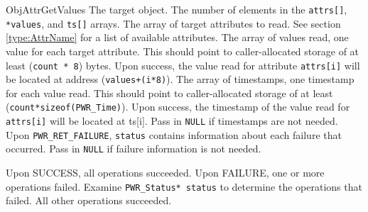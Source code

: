 \begin{prototype}{ObjAttrGetValues}
			{\pInput}{The target object.}
				{\pInput}{The number of elements in the \texttt{attrs[]}, \texttt{*values}, and \texttt{ts[]} arrays.}
		{\pInput}{The array of target attributes to read. See section \ref{type:AttrName} for a list of available attributes.}
			{\pOutput}	{The array of values read, one value for each target attribute. This should point to caller-allocated storage of at least (\texttt{count * 8}) bytes. Upon success, the value read for attribute \texttt{attrs[i]} will be located at address (\texttt{values+(i*8)}).}
			{\pOutput}{The array of timestamps, one timestamp for each value read. This should point to caller-allocated storage of at least (\texttt{count*sizeof(PWR_Time)}). Upon success, the timestamp of the value read for \texttt{attrs[i]} will be located at ts[i]. Pass in \texttt{NULL} if timestamps are not needed.}
			{\pOutput}{Upon \texttt{PWR_RET_FAILURE}, \texttt{status} contains information about each failure that occurred. Pass in \texttt{NULL} if failure information is not needed.}

	 		{Upon SUCCESS, all operations succeeded.}
	 		{Upon FAILURE, one or more operations failed. Examine \texttt{PWR_Status* status} to determine the operations that failed. All other operations succeeded.}
\end{prototype}
